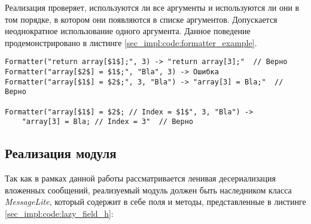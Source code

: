 Реализация проверяет, используются ли все аргументы и используются ли они в том порядке, в котором они появляются в списке аргументов.
Допускается неоднократное использование одного аргумента.
Данное поведение продемонстрировано в листинге \ref{sec_impl:code:formatter_example}.

\begin{lstlisting}[style=CodeListing, label=sec_impl:code:formatter_example, caption={Пример валидации, реализованной в функторе Formatter}]
Formatter("return array[$1$];", 3) -> "return array[3];"  // Верно
Formatter("array[$2$] = $1$;", "Bla", 3) -> Ошибка
Formatter("array[$1$] = $2$;", 3, "Bla") -> "array[3] = Bla;"  // Верно

Formatter("array[$1$] = $2$; // Index = $1$", 3, "Bla") ->
    "array[3] = Bla; // Index = 3"  // Верно
\end{lstlisting}

\subsection{Реализация модуля}

Так как в рамках данной работы рассматривается ленивая десериализация вложенных сообщений, реализуемый модуль должен быть наследником класса \textit{MessageLite},
который содержит в себе поля и методы, представленные в листинге \ref{sec_impl:code:lazy_field_h}:

